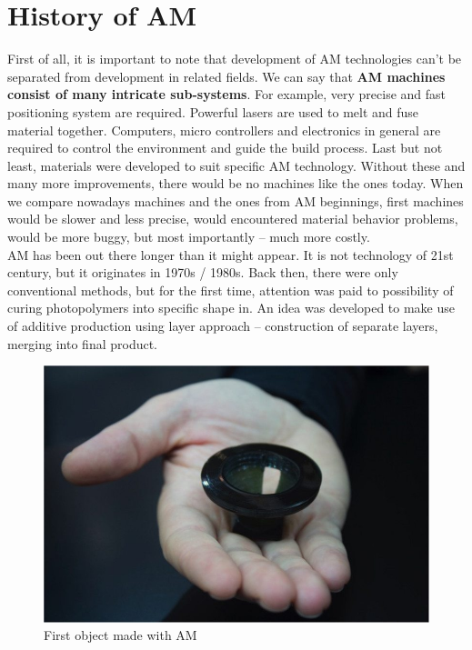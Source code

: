 \documentclass[a4paper, twoside, 11pt]{report}
\begin{document}
\section{History of AM}
First of all, it is important to note that development of AM technologies can't be separated from development in related fields. We can say that \textbf{AM machines consist of many intricate sub-systems}. For example, very precise and fast positioning system are required. Powerful lasers are used to melt and fuse material together. Computers, micro controllers and electronics in general are required to control the environment and guide the build process. Last but not least, materials were developed to suit specific AM technology. Without these and many more improvements, there would be no machines like the ones today. When we compare nowadays machines and the ones from AM beginnings, first machines would be slower and less precise, would encountered material behavior problems, would be more buggy, but most importantly – much more costly.\\
AM has been out there longer than it might appear. It is not technology of 21st century, but it originates in 1970s / 1980s. Back then, there were only conventional methods, but for the first time, attention was paid to possibility of curing photopolymers into specific shape in. An idea was developed to make use of additive production using layer approach – construction of separate layers, merging into final product.\cite{AMOrigins}\\
%
\begin{figure}
 	\includegraphics[width=\textwidth/2]{firstPrintedObject}
	\caption{First object made with AM}
\end{figure}
\end{document}
